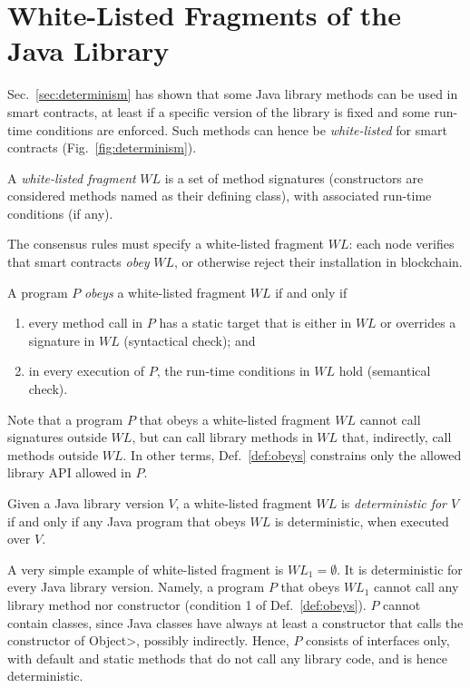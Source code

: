 \section{White-Listed Fragments of the Java Library}\label{sec:white_listing}

\newcommand{\wl}{\mathit{WL}}

Sec.~\ref{sec:determinism} has shown that some Java library methods can be used
in smart contracts, at least if a specific version of the library is fixed and some
run-time conditions are enforced. Such methods can hence be \emph{white-listed} for smart contracts
(Fig.~\ref{fig:determinism}).

\begin{definition}\label{def:white-listing}
  A \emph{white-listed fragment} $\wl$ is a set of method signatures (constructors are considered
  methods named as their defining class), with associated run-time conditions (if any).
\end{definition}
%
The consensus rules must specify a white-listed fragment $\wl$:
each node verifies that smart contracts \emph{obey} $\wl$,
or otherwise reject their installation in blockchain.
%
\begin{definition}\label{def:obeys}
  A program $P$ \emph{obeys} a white-listed fragment $\wl$ if and only if
  \begin{enumerate}
    \item every method call
      in $P$ has a static target that is either in $\wl$ or overrides a signature in $\wl$
      (syntactical check); and
    \item in every execution of $P$, the run-time conditions in $\wl$ hold (semantical check).
  \end{enumerate}
\end{definition}
%
Note that a program $P$ that obeys a white-listed fragment $\wl$ cannot call signatures outside
$\wl$, but can call library methods in $\wl$ that, indirectly, call methods outside $\wl$.
In other terms, Def.~\ref{def:obeys} constrains only the allowed library API allowed in $P$.
%
\begin{definition}\label{def:deterministic}
  Given a Java library version $V$, a white-listed fragment $\wl$ is
  \emph{deterministic for $V$}
  if and only if any Java program that obeys $\wl$
  is deterministic, when executed over $V$.
\end{definition}

A very simple example of white-listed fragment is
$\wl_1=\emptyset$. It is deterministic for every Java library version.
Namely, a program $P$ that obeys $\wl_1$ cannot call any library method nor constructor
(condition 1 of Def.~\ref{def:obeys}). $P$ cannot contain classes, since Java classes
have always at least a constructor that calls the constructor of \<Object>, possibly
indirectly. Hence, $P$ consists of interfaces only,
with default and static methods that do not call any library code, and is hence
deterministic.

